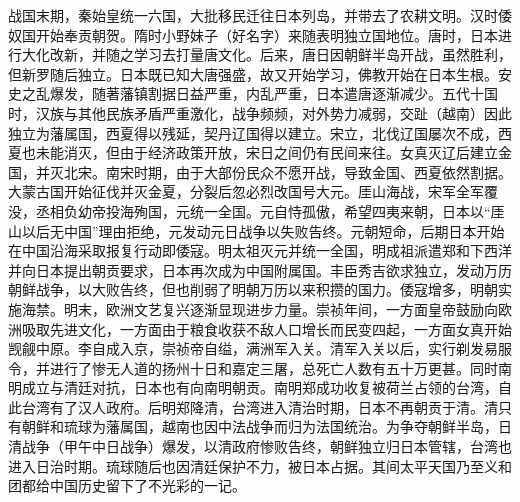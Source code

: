 战国末期，秦始皇统一六国，大批移民迁往日本列岛，并带去了农耕文明。汉时倭奴国开始奉贡朝贺。隋时小野妹子（好名字）来随表明独立国地位。唐时，日本进行大化改新，并随之学习去打量唐文化。后来，唐日因朝鲜半岛开战，虽然胜利，但新罗随后独立。日本既已知大唐强盛，故又开始学习，佛教开始在日本生根。安史之乱爆发，随著藩镇割据日益严重，内乱严重，日本遣唐逐渐减少。五代十国时，汉族与其他民族矛盾严重激化，战争频频，对外势力减弱，交趾（越南）因此独立为藩属国，西夏得以残延，契丹辽国得以建立。宋立，北伐辽国屡次不成，西夏也未能消灭，但由于经济政策开放，宋日之间仍有民间来往。女真灭辽后建立金国，并灭北宋。南宋时期，由于大部份民众不愿开战，导致金国、西夏依然割据。大蒙古国开始征伐并灭金夏，分裂后忽必烈改国号大元。厓山海战，宋军全军覆没，丞相负幼帝投海殉国，元统一全国。元自恃孤傲，希望四夷来朝，日本以“厓山以后无中国”理由拒绝，元发动元日战争以失败告终。元朝短命，后期日本开始在中国沿海采取报复行动即倭寇。明太祖灭元并统一全国，明成祖派遣郑和下西洋并向日本提出朝贡要求，日本再次成为中国附属国。丰臣秀吉欲求独立，发动万历朝鲜战争，以大败告终，但也削弱了明朝万历以来积攒的国力。倭寇增多，明朝实施海禁。明末，欧洲文艺复兴逐渐显现进步力量。崇祯年间，一方面皇帝鼓励向欧洲吸取先进文化，一方面由于粮食收获不敌人口增长而民变四起，一方面女真开始觊觎中原。李自成入京，崇祯帝自缢，满洲军入关。清军入关以后，实行剃发易服令，并进行了惨无人道的扬州十日和嘉定三屠，总死亡人数有五十万更甚。同时南明成立与清廷对抗，日本也有向南明朝贡。南明郑成功收复被荷兰占领的台湾，自此台湾有了汉人政府。后明郑降清，台湾进入清治时期，日本不再朝贡于清。清只有朝鲜和琉球为藩属国，越南也因中法战争而归为法国统治。为争夺朝鲜半岛，日清战争（甲午中日战争）爆发，以清政府惨败告终，朝鲜独立归日本管辖，台湾也进入日治时期。琉球随后也因清廷保护不力，被日本占据。其间太平天国乃至义和团都给中国历史留下了不光彩的一记。


